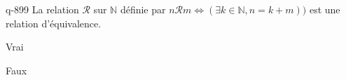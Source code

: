 \begin{truefalse}{q-899}
La relation $\mathcal R$ sur $\mathbb N$ définie par $n\mathcal R m \iff (\exists k\in\mathbb N,n=k+m))$ est une relation d'équivalence.
\item Vrai
\item* Faux
\end{truefalse}

